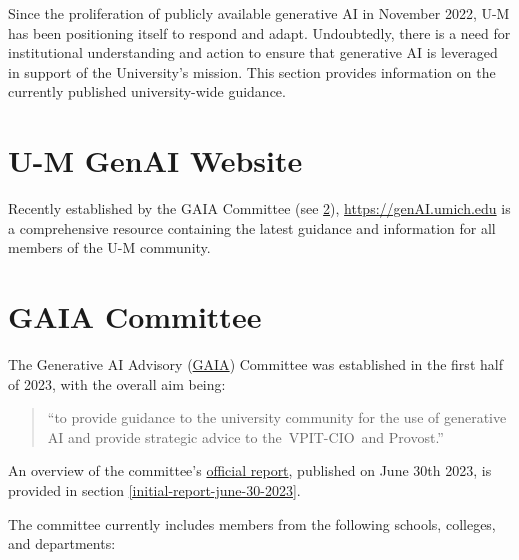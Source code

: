 \documentclass[
]{book}
\begin{document}
Since the proliferation of publicly available generative AI in November 2022, U-M has been positioning itself to respond and adapt. Undoubtedly, there is a need for institutional understanding and action to ensure that generative AI is leveraged in support of the University's mission. This section provides information on the currently published university-wide guidance.

\hypertarget{u-m-genai-website}{%
\section{U-M GenAI Website}\label{u-m-genai-website}}

Recently established by the GAIA Committee (see \ref{gaia-committee}), \url{https://genAI.umich.edu} is a comprehensive resource containing the latest guidance and information for all members of the U-M community.

\hypertarget{gaia-committee}{%
\section{GAIA Committee}\label{gaia-committee}}

The Generative AI Advisory (\href{https://it.umich.edu/strategy-planning/gaia}{GAIA}) Committee was established in the first half of 2023, with the overall aim being:

\begin{quote}
``to provide guidance to the university community for the use of generative AI and provide strategic advice to the~VPIT-CIO~and Provost.''
\end{quote}

An overview of the committee's \href{https://genai.umich.edu/committee-report}{official report}, published on June 30th 2023, is provided in section \ref{initial-report-june-30-2023}.

The committee currently includes members from the following schools, colleges, and departments:
\end{document}
